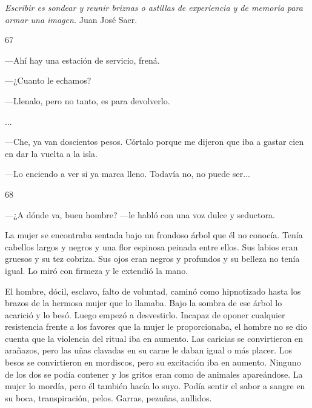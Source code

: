 \documentclass[12pt,twoside,openright,a5paper]{book}
\begin{document}
\nopagebreak

 \emph{Escribir es sondear y reunir briznas o
astillas de experiencia y de memoria para armar una imagen.} Juan José Saer.

\vspace{0.5cm}

\hrulefill \hspace{0.1cm}\decofourleft\hspace{0.2cm} 67 \hspace{0.2cm}\decofourright \hspace{0.1cm}\hrulefill

\nopagebreak

\vspace{0.5cm}

\nopagebreak

---Ahí hay una estación de servicio, frená.

---¿Cuanto le echamos?

---Llenalo, pero no tanto, es para devolverlo.

...

---Che, ya van doscientos pesos. Córtalo porque me dijeron que iba a gastar cien en
dar la vuelta a la isla.

---Lo enciendo a ver si ya marca lleno. Todavía no,
no puede ser...

\vspace{0.5cm}
\afterpage{}
\hrulefill \hspace{0.1cm}\decofourleft\hspace{0.2cm} 68 \hspace{0.2cm}\decofourright \hspace{0.1cm}\hrulefill

\nopagebreak

\vspace{0.5cm}

\nopagebreak

---¿A dónde va, buen hombre? ---le habló con una voz dulce y seductora.

La mujer se encontraba sentada bajo un frondoso árbol que él no
conocía. Tenía cabellos largos y negros y una flor espinosa peinada entre
ellos. Sus labios eran gruesos y su tez cobriza. Sus ojos eran negros y
profundos y su belleza no tenía igual. Lo miró con firmeza y le extendió
la mano.

El hombre, dócil, esclavo, falto de voluntad, caminó como hipnotizado hasta
los brazos de la hermosa mujer que lo llamaba. Bajo la sombra de ese árbol
lo acarició y lo besó. Luego empezó a desvestirlo. Incapaz de oponer
cualquier resistencia frente a los favores que la mujer le proporcionaba,
el hombre no se dio cuenta que la violencia del ritual iba en aumento. Las
caricias se convirtieron en arañazos, pero las uñas clavadas en su carne
le daban igual o más placer. Los besos se convirtieron en mordiscos, pero
su excitación iba en aumento. Ninguno de los dos se podía contener y
los gritos eran como de animales apareándose. La mujer lo mordía, pero
él también hacía lo suyo. Podía sentir el sabor a sangre en su boca,
transpiración, pelos. Garras, pezuñas, aullidos.
\end{document}
